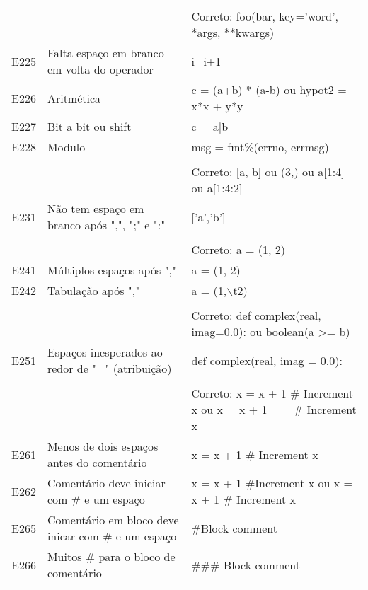 \begin{table}
\begin{tabularx}{\linewidth}{ |l|X|X| }
			& 
			&  \\ 
			\hline
			
			& 
			& Correto: foo(bar, key='word', *args, **kwargs) \\ 
			\hline
			E225 
			& Falta espaço em branco em volta do operador 
			& i=i+1 \\ 
			\hline
			E226 
			& Aritmética 
			& c = (a+b) * (a-b) ou hypot2 = x*x + y*y \\ 
			\hline
			E227 
			& Bit a bit ou shift 
			& c = a|b \\ 
			\hline
			E228 
			& Modulo 
			& msg = fmt\%(errno, errmsg) \\ 
			\hline
			
			& 
			&  \\ 
			\hline
			
			& 
			& Correto: [a, b] ou (3,) ou a[1:4] ou a[1:4:2] \\ 
			\hline
			E231 
			& Não tem espaço em branco após ",", ";" e ":" 
			& ['a','b'] \\ 
			\hline
			
			& 
			&  \\ 
			\hline
			
			& 
			& Correto: a = (1, 2) \\ 
			\hline
			E241 
			& Múltiplos espaços após "," 
			& a = (1,  2) \\ 
			\hline
			E242 
			& Tabulação após "," 
			& a = (1,$\backslash$t2) \\ 
			\hline
			
			& 
			&  \\ 
			\hline
			
			& 
			& Correto: def complex(real, imag=0.0): ou boolean(a >= b) \\ 
			\hline
			E251 
			& Espaços inesperados ao redor de "=" (atribuição) 
			& def complex(real, imag = 0.0): \\ 
			\hline
			
			& 
			&  \\ 
			\hline
			
			& 
			& Correto: x = x + 1  \# Increment x ou x = x + 1 \ \ \ \ \# Increment x \\ 
			\hline
			E261 
			& Menos de dois espaços antes do comentário 
			& x = x + 1 \# Increment x \\ 
			\hline
			E262 
			& Comentário deve iniciar com \# e um espaço 
			& x = x + 1  \#Increment x ou x = x + 1  \#  Increment x \\ 
			\hline
			E265 
			& Comentário em bloco deve inicar com \# e um espaço 
			& \#Block comment \\ 
			\hline
			E266 
			& Muitos \# para o bloco de comentário 
			& \#\#\# Block comment \\ 
			\hline
			

\end{tabularx}
\end{table}
